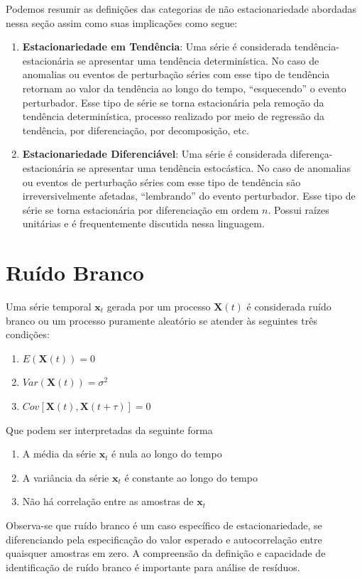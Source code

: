 Podemos resumir as definições das categorias de não estacionariedade abordadas
nessa seção assim como suas implicações como segue:

\begin{enumerate}
    \item \textbf{Estacionariedade em Tendência}: Uma série é considerada
        tendência-estacionária se apresentar uma tendência determinística. No
        caso de anomalias ou eventos de perturbação séries com esse tipo de
        tendência retornam ao valor da tendência ao longo do tempo,
        ``esquecendo'' o evento perturbador. Esse tipo de série se torna
        estacionária pela remoção da tendência determinística, processo
        realizado por meio de regressão da tendência, por diferenciação, por
        decomposição, etc.
    \item \textbf{Estacionariedade Diferenciável}: Uma série é considerada
        diferença-estacionária se apresentar uma tendência estocástica. No
        caso de anomalias ou eventos de perturbação séries com esse tipo de
        tendência são irreversivelmente afetadas,
        ``lembrando'' do evento perturbador. Esse tipo de série se torna
        estacionária por diferenciação em ordem $n$. Possui raízes unitárias
        e é frequentemente discutida nessa linguagem.

\end{enumerate}

\section{Ruído Branco}\label{sec:white_noise}

Uma série temporal $\mathbf{x}_t$ gerada por um processo $\mathbf{X}(t)$ é
considerada ruído branco ou um processo puramente aleatório se atender às
seguintes três condições:

\begin{enumerate}
    \item $E(\mathbf{X}(t)) = 0$
    \item $Var(\mathbf{X}(t)) = \sigma^2$
    \item $Cov[\mathbf{X}(t), \mathbf{X}(t+\tau)] = 0$
\end{enumerate}\vspace{.5cm}

Que podem ser interpretadas da seguinte forma

\begin{enumerate}
    \item A média da série $\mathbf{x}_t$ é nula ao longo do tempo
    \item A variância da série $\mathbf{x}_t$ é constante ao longo do tempo
    \item Não há correlação entre as amostras de $\mathbf{x}_t$
\end{enumerate}\vspace{.5cm}

Observa-se que ruído branco é um caso específico de estacionariedade, se
diferenciando pela especificação do valor esperado e autocorrelação entre
quaisquer amostras em zero. A compreensão da definição e capacidade de
identificação de ruído branco é importante para análise de resíduos.
